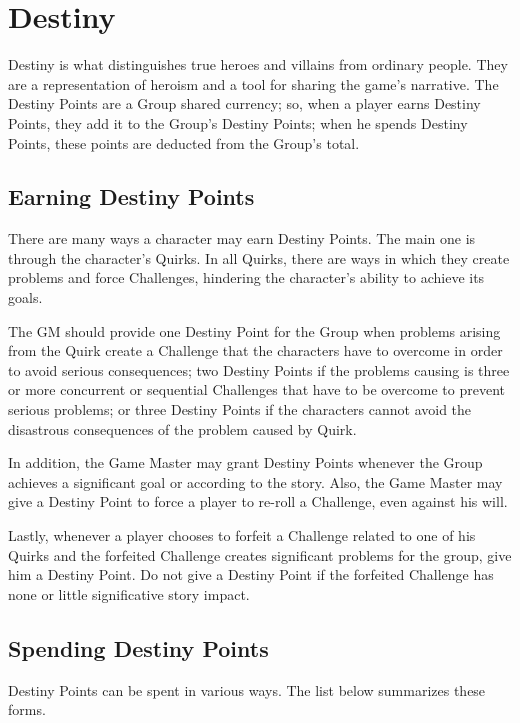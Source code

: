 \section{Destiny}\label{sec:destiny}
\begin{multicols}{2}
Destiny is what distinguishes true heroes and villains from ordinary people. They are a representation of heroism and a tool for sharing the game's narrative. The Destiny Points are a Group shared currency; so, when a player earns Destiny Points, they add it to the Group’s Destiny Points; when he spends Destiny Points, these points are deducted from the Group's total.

\subsection{Earning Destiny Points}\label{subsec:earndp}
There are many ways a character may earn Destiny Points. The main one is through the character's Quirks. In all Quirks, there are ways in which they create problems and force Challenges, hindering the character’s ability to achieve its goals.

The GM should provide one Destiny Point for the Group when problems arising from the Quirk create a Challenge that the characters have to overcome in order to avoid serious consequences; two Destiny Points if the problems causing is three or more concurrent or sequential Challenges that have to be overcome to prevent serious problems; or three Destiny Points if the characters cannot avoid the disastrous consequences of the problem caused by Quirk.

In addition, the Game Master may grant Destiny Points whenever the Group achieves a significant goal or according to the story. Also, the Game Master may give a Destiny Point to force a player to re-roll a Challenge, even against his will.

Lastly, whenever a player chooses to forfeit a Challenge related to one of his Quirks and the forfeited Challenge creates significant problems for the group, give him a Destiny Point. Do not give a Destiny Point if the forfeited Challenge has none or little significative story impact.

\begin{center}
\end{center}

\subsection{Spending Destiny Points}\label{subsec:spenddp}
Destiny Points can be spent in various ways. The list below summarizes these forms.


\end{multicols}
